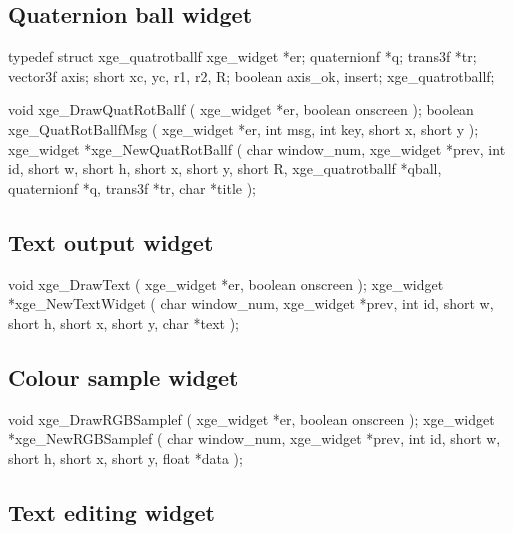 \newpage
\subsection{Quaternion ball widget}

\begin{listingC}
typedef struct xge_quatrotballf {
    xge_widget  *er;
    quaternionf *q;
    trans3f     *tr;
    vector3f    axis;
    short       xc, yc, r1, r2, R;
    boolean     axis_ok, insert;
  } xge_quatrotballf;

void xge_DrawQuatRotBallf ( xge_widget *er, boolean onscreen );
boolean xge_QuatRotBallfMsg ( xge_widget *er,
                              int msg, int key, short x, short y );
xge_widget *xge_NewQuatRotBallf ( char window_num, xge_widget *prev,
                         int id,
                         short w, short h, short x, short y, short R,
                         xge_quatrotballf *qball, quaternionf *q,
                         trans3f *tr, char *title );
\end{listingC}


\subsection{Text output widget}

\begin{listingC}
void xge_DrawText ( xge_widget *er, boolean onscreen );
xge_widget *xge_NewTextWidget ( char window_num, xge_widget *prev,
                                int id,
                                short w, short h, short x, short y,
                                char *text );
\end{listingC}


\subsection{Colour sample widget}

\begin{listingC}
void xge_DrawRGBSamplef ( xge_widget *er, boolean onscreen );
xge_widget *xge_NewRGBSamplef ( char window_num, xge_widget *prev,
                                int id,
                                short w, short h, short x, short y,
                                float *data );
\end{listingC}


\newpage
\subsection{Text editing widget}

